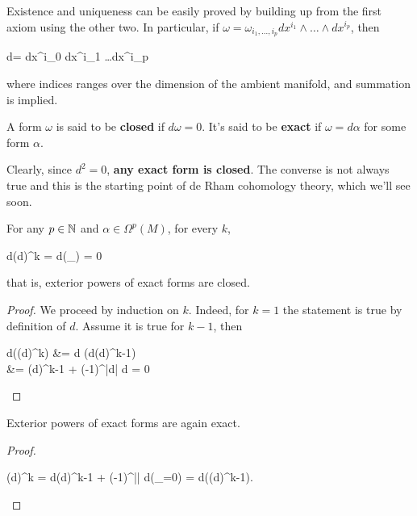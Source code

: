 \documentclass[main.tex]{subfiles}
\begin{document}
Existence and uniqueness can be easily proved by building up from the first axiom using the other two. In particular, if $\omega = \omega_{i_1, \ldots, i_p} dx^{i_1} \wedge \ldots \wedge dx^{i_p}$, then
\begin{eqalign}
	d\omega =  dx^{i_0} \wedge dx^{i_1} \wedge \ldots \wedge dx^{i_p}
\end{eqalign}
where indices ranges over the dimension of the ambient manifold, and summation is implied.

\begin{definition}
	A form $\omega$ is said to be \textbf{closed} if $d\omega = 0$. It's said to be \textbf{exact} if $\omega = d\alpha$ for some form $\alpha$.
\end{definition}

Clearly, since $d^2 = 0$, \textbf{any exact form is closed}. The converse is not always true and this is the starting point of de Rham cohomology theory, which we'll see soon.

\begin{lemma}
\label{lemma:der_of_ext_power}
	For any $p \in \mathbb{N}$ and $\alpha \in \Omega^p(M)$, for every $k$,
	\begin{eqalign}
		d(d\alpha)^{\wedge k} = d(_{}) = 0
	\end{eqalign}
	that is, exterior powers of exact forms are closed.
\end{lemma}
\begin{proof}
	We proceed by induction on $k$. Indeed, for $k=1$ the statement is true by definition of $d$. Assume it is true for $k-1$, then
	\begin{eqalign}
		d\left((d\alpha\right)^{\wedge k}) &= d \left(d\alpha \wedge (d\alpha)^{\wedge k-1}\right)\\
		&=  \wedge (d\alpha)^{k-1} + (-1)^{|d\alpha|} d\alpha \wedge \cancel{d\left(d\alpha^{\wedge k-1}\right)} = 0
	\end{eqalign}
\end{proof}
\begin{corollary}
\label{cor:ext_power_is_exact}
	Exterior powers of exact forms are again exact.
\end{corollary}
\begin{proof}
	\begin{eqalign}
		(d\alpha)^{\wedge k} = d\alpha \wedge (d\alpha)^{\wedge k-1}  + (-1)^{|\alpha|} \alpha \wedge d(_{=0}) = d\left(\alpha \wedge (d\alpha)^{\wedge k-1}\right).
	\end{eqalign}
\end{proof}
\end{document}
